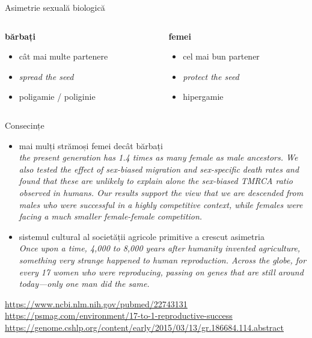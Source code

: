 \documentclass{simple}
\begin{document}
\begin{frame}{Asimetrie sexuală biologică}
  \begin{columns}
    \begin{column}{0.5\textwidth}
      \pause
      \textbf{bărbați}
        \begin{itemize}
          \scriptsize
          \pause
          \item cât mai multe partenere
          \pause
          \item \textit{spread the seed}
          \pause
          \item poligamie / poliginie
        \end{itemize}
    \end{column}
    \begin{column}{0.5\textwidth}
      \pause
      \textbf{femei}
        \begin{itemize}
          \scriptsize
          \pause
          \item cel mai bun partener
          \pause
          \item \textit{protect the seed}
          \pause
          \item hipergamie
        \end{itemize}
    \end{column}
  \end{columns}
\end{frame}

\begin{frame}{Consecințe}
  \begin{itemize}
    \pause
    \item mai mulți strămoși femei decât bărbați \\
      \textit{the present generation has 1.4 times as many female as male ancestors. We also tested the effect of sex-biased migration and sex-specific death rates and found that these are unlikely to explain alone the sex-biased TMRCA ratio observed in humans. Our results support the view that we are descended from males who were successful in a highly competitive context, while females were facing a much smaller female-female competition.}
    \pause
    \item sistemul cultural al societății agricole primitive a crescut asimetria \\
      \textit{Once upon a time, 4,000 to 8,000 years after humanity invented agriculture, something very strange happened to human reproduction. Across the globe, for every 17 women who were reproducing, passing on genes that are still around today—only one man did the same.}
  \end{itemize}
  \pause
  \url{https://www.ncbi.nlm.nih.gov/pubmed/22743131} \\
  \url{https://psmag.com/environment/17-to-1-reproductive-success} \\
  \url{https://genome.cshlp.org/content/early/2015/03/13/gr.186684.114.abstract}
\end{frame}
\end{document}
